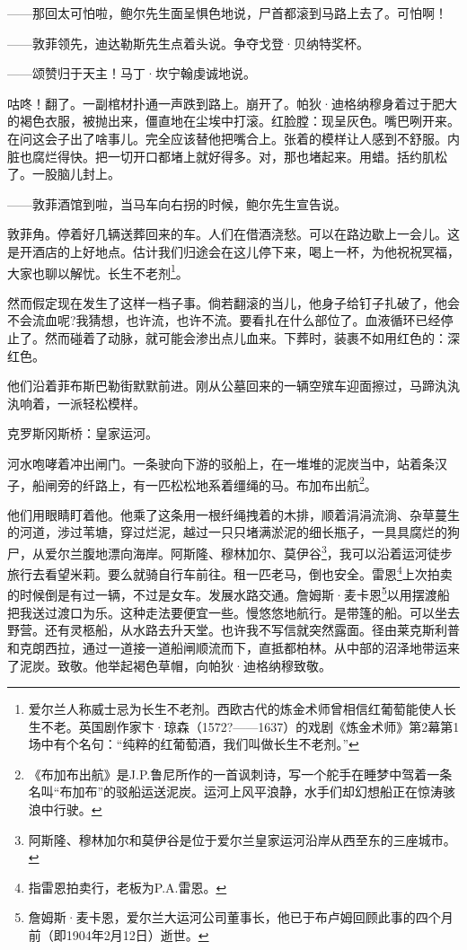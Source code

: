 \par ——那回太可怕啦，鲍尔先生面呈惧色地说，尸首都滚到马路上去了。可怕啊！
\par ——敦菲领先，迪达勒斯先生点着头说。争夺戈登·贝纳特奖杯。
\par ——颂赞归于天主！马丁·坎宁翰虔诚地说。
\par 咕咚！翻了。一副棺材扑通一声跌到路上。崩开了。帕狄·迪格纳穆身着过于肥大的褐色衣服，被抛出来，僵直地在尘埃中打滚。红脸膛：现呈灰色。嘴巴咧开来。在问这会子出了啥事儿。完全应该替他把嘴合上。张着的模样让人感到不舒服。内脏也腐烂得快。把一切开口都堵上就好得多。对，那也堵起来。用蜡。括约肌松了。一股脑儿封上。
\par ——敦菲酒馆到啦，当马车向右拐的时候，鲍尔先生宣告说。
\par 敦菲角。停着好几辆送葬回来的车。人们在借酒浇愁。可以在路边歇上一会儿。这是开酒店的上好地点。估计我们归途会在这儿停下来，喝上一杯，为他祝祝冥福，大家也聊以解忧。长生不老剂\footnote{爱尔兰人称威士忌为长生不老剂。西欧古代的炼金术师曾相信红葡萄能使人长生不老。英国剧作家卞·琼森（1572?——1637）的戏剧《炼金术师》第2幕第1场中有个名句：“纯粹的红葡萄酒，我们叫做长生不老剂。”}。
\par 然而假定现在发生了这样一档子事。倘若翻滚的当儿，他身子给钉子扎破了，他会不会流血呢?我猜想，也许流，也许不流。要看扎在什么部位了。血液循环已经停止了。然而碰着了动脉，就可能会渗出点儿血来。下葬时，装裹不如用红色的：深红色。
\par 他们沿着菲布斯巴勒街默默前进。刚从公墓回来的一辆空殡车迎面擦过，马蹄汍汍汍响着，一派轻松模样。
\par 克罗斯冈斯桥：皇家运河。
\par 河水咆哮着冲出闸门。一条驶向下游的驳船上，在一堆堆的泥炭当中，站着条汉子，船闸旁的纤路上，有一匹松松地系着缰绳的马。布加布出航\footnote{《布加布出航》是J.P.鲁尼所作的一首讽刺诗，写一个舵手在睡梦中驾着一条名叫“布加布”的驳船运送泥炭。运河上风平浪静，水手们却幻想船正在惊涛骇浪中行驶。}。
\par 他们用眼睛盯着他。他乘了这条用一根纤绳拽着的木排，顺着涓涓流淌、杂草蔓生的河道，涉过苇塘，穿过烂泥，越过一只只堵满淤泥的细长瓶子，一具具腐烂的狗尸，从爱尔兰腹地漂向海岸。阿斯隆、穆林加尔、莫伊谷\footnote{阿斯隆、穆林加尔和莫伊谷是位于爱尔兰皇家运河沿岸从西至东的三座城市。}，我可以沿着运河徒步旅行去看望米莉。要么就骑自行车前往。租一匹老马，倒也安全。雷恩\footnote{指雷恩拍卖行，老板为P.A.雷恩。}上次拍卖的时候倒是有过一辆，不过是女车。发展水路交通。詹姆斯·麦卡恩\footnote{詹姆斯·麦卡恩，爱尔兰大运河公司董事长，他已于布卢姆回顾此事的四个月前（即1904年2月12日）逝世。}以用摆渡船把我送过渡口为乐。这种走法要便宜一些。慢悠悠地航行。是带篷的船。可以坐去野营。还有灵柩船，从水路去升天堂。也许我不写信就突然露面。径由莱克斯利普和克朗西拉，通过一道接一道船闸顺流而下，直抵都柏林。从中部的沼泽地带运来了泥炭。致敬。他举起褐色草帽，向帕狄·迪格纳穆致敬。
